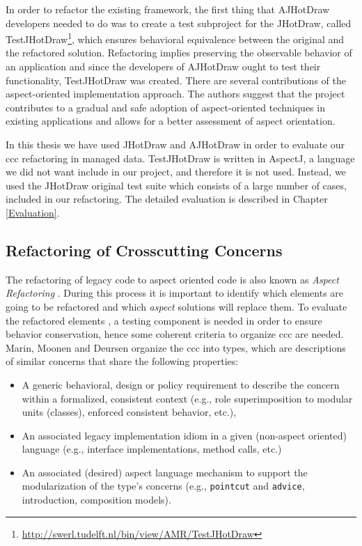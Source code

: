 In order to refactor the existing framework, the first thing that AJHotDraw developers needed to do was to create a test subproject for the JHotDraw, called TestJHotDraw\footnote{\url{http://swerl.tudelft.nl/bin/view/AMR/TestJHotDraw}}, which ensures behavioral equivalence between the original and the refactored solution. 
Refactoring implies preserving the observable behavior of an application\cite{fowler2009refactoring} and since the developers of AJHotDraw ought to test their functionality, TestJHotDraw was created. 
There are several contributions of the aspect-oriented implementation approach\cite{marinajhotdraw}. 
The authors suggest that the project contributes to a gradual and safe adoption of aspect-oriented techniques in existing applications and allows for a better assessment of aspect orientation.

In this thesis we have used JHotDraw and AJHotDraw in order to evaluate our \ac{ccc} refactoring in managed data.
TestJHotDraw is written in AspectJ, a language we did not want include in our project, and therefore it is not used.
Instead, we used the JHotDraw original test suite which consists of a large number of cases, included in our refactoring.
The detailed evaluation is described in Chapter \ref{Evaluation}.

\subsection{Refactoring of Crosscutting Concerns}\label{Refactoring of ccc}
The refactoring of legacy code to aspect oriented code is also known as \textit{Aspect Refactoring} \cite{marin2005approach}. 
During this process it is important to identify which elements are going to be refactored and which \textit{aspect} solutions will replace them. 
To evaluate the refactored elements \cite{fowler2009refactoring}, a testing component is needed in order to ensure behavior conservation, hence some coherent criteria to organize \ac{ccc} are needed. 
Marin, Moonen and Deursen \cite{marin2005approach} organize the \ac{ccc} into types, which are descriptions of similar concerns that share the following properties: 

\begin{itemize}
	\item A generic behavioral, design or policy requirement to describe the concern within a formalized, consistent context (e.g., role superimposition to modular units (classes), enforced consistent behavior, etc.),

	\item An associated legacy implementation idiom in a given (non-aspect oriented) language (e.g., interface implementations, method calls, etc.)

	\item An associated (desired) aspect language mechanism to support the modularization of the type's concerns (e.g., \texttt{pointcut} and \texttt{advice}, introduction, composition models).
\end{itemize}

